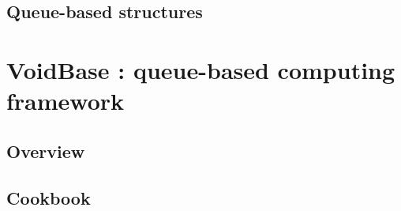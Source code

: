 \documentclass[]{book}    %
\begin{document}
\section{Queue-based structures}

\chapter{VoidBase : queue-based computing framework}
\section{Overview}
\section{Cookbook}




\backmatter 
\end{document}
